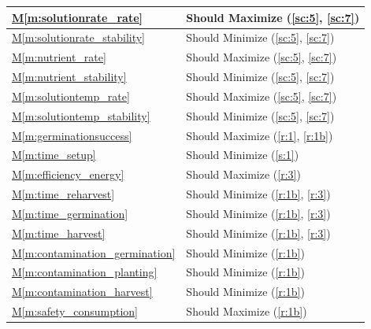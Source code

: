 \documentclass{../tex/report}
\newcommand{\mref}[1]{\hyperref[#1]{M\ref{#1}}}
\begin{document}
\begin{tabular}{|l|p{14.35cm}|}
    \mref{m:solutionrate_rate}          & Should Maximize           \hfill (\ref{sc:5}, \ref{sc:7})             \\ \hline
    \mref{m:solutionrate_stability}     & Should Minimize           \hfill (\ref{sc:5}, \ref{sc:7})             \\ \hline
    \mref{m:nutrient_rate}              & Should Maximize           \hfill (\ref{sc:5}, \ref{sc:7})             \\ \hline
    \mref{m:nutrient_stability}         & Should Minimize           \hfill (\ref{sc:5}, \ref{sc:7})             \\ \hline
    \mref{m:solutiontemp_rate}          & Should Maximize           \hfill (\ref{sc:5}, \ref{sc:7})             \\ \hline
    \mref{m:solutiontemp_stability}     & Should Minimize           \hfill (\ref{sc:5}, \ref{sc:7})             \\ \hline
    \mref{m:germinationsuccess}         & Should Maximize           \hfill (\ref{r:1}, \ref{r:1b})              \\ \hline
    \mref{m:time_setup}                 & Should Minimize           \hfill (\ref{s:1})                          \\ \hline
    \mref{m:efficiency_energy}          & Should Maximize           \hfill (\ref{r:3})                          \\ \hline
    \mref{m:time_reharvest}             & Should Minimize           \hfill (\ref{r:1b}, \ref{r:3})              \\ \hline
    \mref{m:time_germination}           & Should Minimize           \hfill (\ref{r:1b}, \ref{r:3})              \\ \hline
    \mref{m:time_harvest}               & Should Minimize           \hfill (\ref{r:1b}, \ref{r:3})              \\ \hline
    \mref{m:contamination_germination}  & Should Minimize           \hfill (\ref{r:1b})                         \\ \hline
    \mref{m:contamination_planting}     & Should Minimize           \hfill (\ref{r:1b})                         \\ \hline
    \mref{m:contamination_harvest}      & Should Minimize           \hfill (\ref{r:1b})                         \\ \hline
    \mref{m:safety_consumption} & Should Maximize \hfill (\ref{r:1b}) \\ \hline

\end{tabular}
\end{document}
